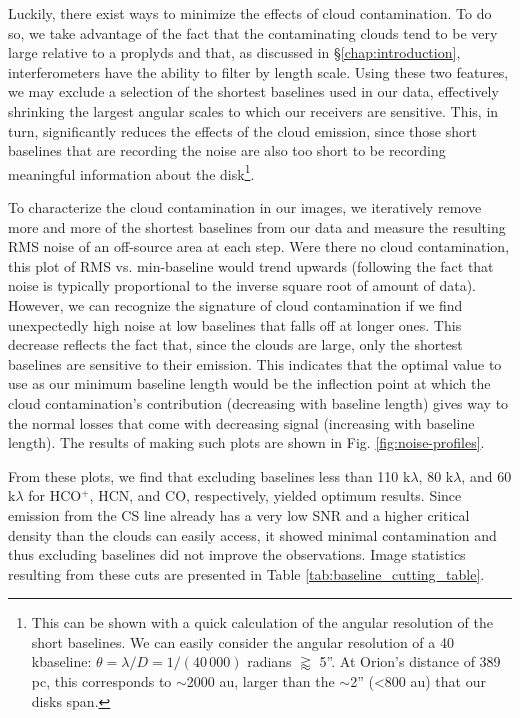 Luckily, there exist ways to minimize the effects of cloud contamination. To do so, we take advantage of the fact that the contaminating clouds tend to be very large relative to a proplyds and that, as discussed in \S\ref{chap:introduction}, interferometers have the ability to filter by length scale. Using these two features, we may exclude a selection of the shortest baselines used in our data, effectively shrinking the largest angular scales to which our receivers are sensitive. This, in turn, significantly reduces the effects of the cloud emission, since those short baselines that are recording the noise are also too short to be recording meaningful information about the disk\footnote{This can be shown with a quick calculation of the angular resolution of the short baselines. We can easily consider the angular resolution of a 40\,k\lambda baseline: $\theta = \lambda/D = 1/(40\,000)$ radians $\gtrapprox$ 5''. At Orion's distance of 389 pc, this corresponds to $\sim$2000 au, larger than the $\sim$2'' (\textless800 au) that our disks span.}.


To characterize the cloud contamination in our images, we iteratively remove more and more of the shortest baselines from our data and measure the resulting RMS noise of an off-source area at each step. Were there no cloud contamination, this plot of RMS vs. min-baseline would trend upwards (following the fact that noise is typically proportional to the inverse square root of amount of data). However, we can recognize the signature of cloud contamination if we find unexpectedly high noise at low baselines that falls off at longer ones. This decrease reflects the fact that, since the clouds are large, only the shortest baselines are sensitive to their emission. This indicates that the optimal value to use as our minimum baseline length would be the inflection point at which the cloud contamination's contribution (decreasing with baseline length) gives way to the normal losses that come with decreasing signal (increasing with baseline length). The results of making such plots are shown in Fig. \ref{fig:noise-profiles}.

From these plots, we find that excluding baselines less than 110 k$\lambda$, 80 k$\lambda$, and 60  k$\lambda$ for HCO$^{+}$, HCN, and CO, respectively, yielded optimum results. Since emission from the CS line already has a very low SNR and a higher critical density than the clouds can easily access, it showed minimal contamination and thus excluding baselines did not improve the observations. Image statistics resulting from these cuts are presented in Table \ref{tab:baseline_cutting_table}.

